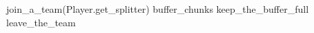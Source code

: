\documentclass{article}
\begin{document}
\pagestyle{empty}

\newcommand{\send}{\Rightarrow}
\newcommand{\sendto}{\rightarrow}
\algrenewcommand{}
\algrenewcommand\textproc{\textrm}

\begin{algorithmic}

  \State join\_a\_team(Player.get\_splitter)
  \State buffer\_chunks
  \State keep\_the\_buffer\_full
  \EndWhile
  \State leave\_the\_team
  \EndProcedure
    
\end{algorithmic}
\end{document}
